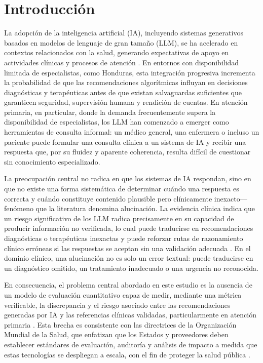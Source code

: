 \documentclass[final,11pt,3p]{elsarticle}
\begin{document}
\pagestyle{empty}



\section{Introducción}
\label{S:1}

La adopción de la inteligencia artificial (IA), incluyendo sistemas generativos basados en modelos de lenguaje de gran tamaño (LLM), se ha acelerado en contextos relacionados con la salud, generando expectativas de apoyo en actividades clínicas y procesos de atención \cite{who2024}. En entornos con disponibilidad limitada de especialistas, como Honduras, esta integración progresiva incrementa la probabilidad de que las recomendaciones algorítmicas influyan en decisiones diagnósticas y terapéuticas antes de que existan salvaguardas suficientes que garanticen seguridad, supervisión humana y rendición de cuentas. En atención primaria, en particular, donde la demanda frecuentemente supera la disponibilidad de especialistas, los LLM han comenzado a emerger como herramientas de consulta informal: un médico general, una enfermera o incluso un paciente puede formular una consulta clínica a un sistema de IA y recibir una respuesta que, por su fluidez y aparente coherencia, resulta difícil de cuestionar sin conocimiento especializado.

La preocupación central no radica en que los sistemas de IA respondan, sino en que no existe una forma sistemática de determinar cuándo una respuesta es correcta y cuándo constituye contenido plausible pero clínicamente inexacto---fenómeno que la literatura denomina alucinación. La evidencia clínica indica que un riesgo significativo de los LLM radica precisamente en su capacidad de producir información no verificada, lo cual puede traducirse en recomendaciones diagnósticas o terapéuticas inexactas y puede reforzar rutas de razonamiento clínico erróneas si las respuestas se aceptan sin una validación adecuada \cite{roustan2025}. En el dominio clínico, una alucinación no es solo un error textual: puede traducirse en un diagnóstico omitido, un tratamiento inadecuado o una urgencia no reconocida.

En consecuencia, el problema central abordado en este estudio es la ausencia de un modelo de evaluación cuantitativo capaz de medir, mediante una métrica verificable, la discrepancia y el riesgo asociado entre las recomendaciones generadas por IA y las referencias clínicas validadas, particularmente en atención primaria \cite{who2024,roustan2025}. Esta brecha es consistente con las directrices de la Organización Mundial de la Salud, que enfatizan que los Estados y proveedores deben establecer estándares de evaluación, auditoría y análisis de impacto a medida que estas tecnologías se despliegan a escala, con el fin de proteger la salud pública \cite{who2024}.
\end{document}
